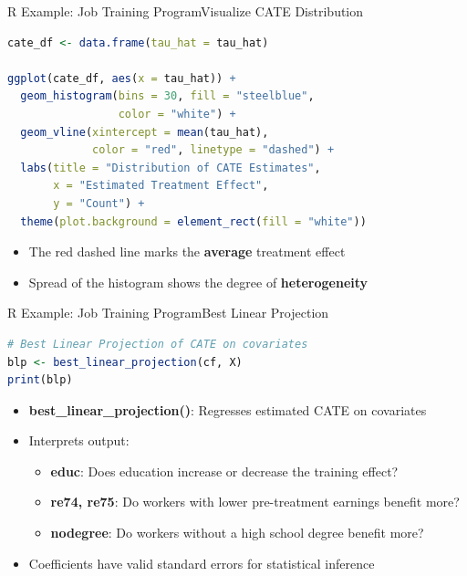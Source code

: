 \documentclass[hyperref={pdfpagelabels=false}]{beamer}
\begin{document}
\begin{frame}[fragile]{R Example: Job Training Program}{Visualize CATE Distribution}
\begin{lstlisting}[language=R]
cate_df <- data.frame(tau_hat = tau_hat)

ggplot(cate_df, aes(x = tau_hat)) +
  geom_histogram(bins = 30, fill = "steelblue",
                 color = "white") +
  geom_vline(xintercept = mean(tau_hat),
             color = "red", linetype = "dashed") +
  labs(title = "Distribution of CATE Estimates",
       x = "Estimated Treatment Effect",
       y = "Count") +
  theme(plot.background = element_rect(fill = "white"))
\end{lstlisting}
	\begin{itemize}
		\item The red dashed line marks the \textbf{average} treatment effect
		\vspace{0.2cm}
		\item Spread of the histogram shows the degree of \textbf{heterogeneity}
	\end{itemize}
\end{frame}




\begin{frame}[fragile]{R Example: Job Training Program}{Best Linear Projection}
\begin{lstlisting}[language=R]
# Best Linear Projection of CATE on covariates
blp <- best_linear_projection(cf, X)
print(blp)
\end{lstlisting}
	\begin{itemize}
		\item \textbf{best\_linear\_projection()}: Regresses estimated CATE on covariates
		\vspace{0.3cm}
		\item Interprets output:
		\vspace{0.2cm}
		\begin{itemize}
			\item \textbf{educ}: Does education increase or decrease the training effect?
			\vspace{0.2cm}
			\item \textbf{re74, re75}: Do workers with lower pre-treatment earnings benefit more?
			\vspace{0.2cm}
			\item \textbf{nodegree}: Do workers without a high school degree benefit more?
		\end{itemize}
		\vspace{0.3cm}
		\item Coefficients have valid standard errors for statistical inference
	\end{itemize}
\end{frame}
\end{document}
